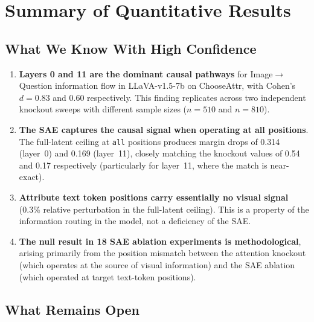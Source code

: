 \documentclass[11pt,a4paper]{article}
\begin{document}
\section{Summary of Quantitative Results}
\label{sec:summary}

\subsection{What We Know With High Confidence}

\begin{enumerate}
  \item \textbf{Layers 0 and 11 are the dominant causal pathways} for Image$\to$Question
    information flow in LLaVA-v1.5-7b on ChooseAttr, with Cohen's $d = 0.83$ and $0.60$
    respectively. This finding replicates across two independent knockout sweeps with different
    sample sizes ($n = 510$ and $n = 810$).

  \item \textbf{The SAE captures the causal signal when operating at all positions}.
    The full-latent ceiling at \texttt{all} positions produces margin drops of 0.314 (layer~0)
    and 0.169 (layer~11), closely matching the knockout values of 0.54 and 0.17 respectively
    (particularly for layer~11, where the match is near-exact).

  \item \textbf{Attribute text token positions carry essentially no visual signal} (0.3\%
    relative perturbation in the full-latent ceiling). This is a property of the information
    routing in the model, not a deficiency of the SAE.

  \item \textbf{The null result in 18 SAE ablation experiments is methodological}, arising
    primarily from the position mismatch between the attention knockout (which operates at
    the source of visual information) and the SAE ablation (which operated at target
    text-token positions).
\end{enumerate}

\subsection{What Remains Open}
\end{document}
